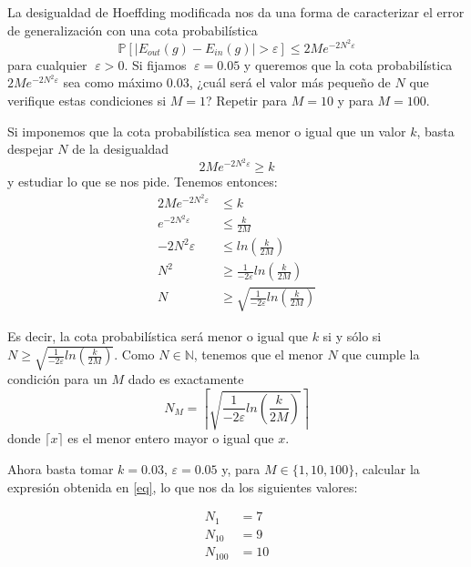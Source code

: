 \documentclass[a4paper, 11pt]{article}
\begin{document}
    \begin{ejercicio}
        La desigualdad de Hoeffding modificada nos da una forma de caracterizar el error de generalización con una cota probabilística
        \[
        \mathbb{P}[\vert E_{out}(g) - E_{in}(g) \vert > \varepsilon] \leq 2 M e^{-2 N^2 \varepsilon}
        \]
        para cualquier $\varepsilon > 0$. Si fijamos $\varepsilon = 0.05$ y queremos que la cota probabilística $2 M e^{-2 N^2 \varepsilon}$ sea como máximo $0.03$, ¿cuál será el valor más pequeño de $N$ que verifique estas condiciones si $M = 1$? Repetir para $M = 10$ y para $M = 100$.
    \end{ejercicio}

    \begin{solucion}
        Si imponemos que la cota probabilística sea menor o igual que un valor $k$, basta despejar $N$ de la desigualdad
        \[
        2 M e^{-2 N^2 \varepsilon} \geq k
        \]
        y estudiar lo que se nos pide. Tenemos entonces:
        \begin{align*}
            2 M e^{-2 N^2 \varepsilon} &\leq k \\
            e^{-2 N^2 \varepsilon} &\leq \frac{k}{2M} \\
            -2 N^2 \varepsilon &\leq ln(\frac{k}{2M}) \\
            N^2 &\geq \frac{1}{-2\varepsilon} ln(\frac{k}{2M}) \\
            N &\geq \sqrt{\frac{1}{-2\varepsilon} ln(\frac{k}{2M})}
        \end{align*}

        Es decir, la cota probabilística será menor o igual que $k$ si y sólo si $N \geq \sqrt{\frac{1}{-2\varepsilon} ln(\frac{k}{2M})}$. Como $N \in \mathbb{N}$, tenemos que el menor $N$ que cumple la condición para un $M$ dado es exactamente
        \begin{equation}
            N_M = \left\lceil \sqrt{\frac{1}{-2\varepsilon} ln\left(\frac{k}{2M}\right)} \right\rceil
            \label{eq}
        \end{equation}
        donde $\lceil x \rceil$ es el menor entero mayor o igual que $x$.

        Ahora basta tomar $k = 0.03$, $\varepsilon = 0.05$ y, para $M \in \{1, 10, 100\}$, calcular la expresión obtenida en \ref{eq}, lo que nos da los siguientes valores:

        \begin{align*}
            N_1 &= 7 \\
            N_{10} &= 9 \\
            N_{100} &= 10
        \end{align*}
    \end{solucion}
\end{document}
